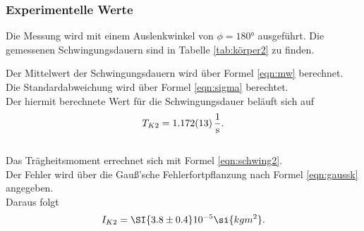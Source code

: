 \subsubsection{Experimentelle Werte}
Die Messung wird mit einem Auslenkwinkel von $\phi=180°$ ausgeführt.
Die gemessenen Schwingungsdauern sind in Tabelle \ref{tab:körper2} zu finden.

Der Mittelwert der Schwingungsdauern wird über Formel \eqref{eqn:mw} berechnet.
\\Die Standardabweichung wird über Formel \eqref{eqn:sigma} berechtet.
\\Der hiermit berechnete Wert für die Schwingungsdauer beläuft sich auf
\begin{equation*}
  T_{K2}=\SI{1.172 \pm 0.013}{\frac{1}{s}}.
\end{equation*}
\\Das Trägheitsmoment errechnet sich mit Formel \eqref{eqn:schwing2}.
\\Der Fehler wird über die Gauß'sche Fehlerfortpflanzung nach Formel \eqref{eqn:gaussk} angegeben.
\\Daraus folgt
\begin{equation*}
  I_{K2}= \SI{3.8 \pm 0.4} 10^{-5} \si{kg m^2}.
\end{equation*}


